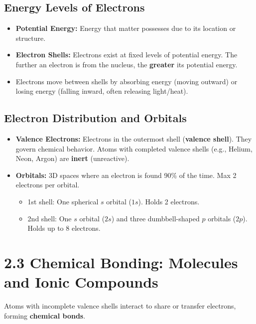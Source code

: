 \documentclass[11pt, a4paper]{article}
\begin{document}
\subsection*{Energy Levels of Electrons}
\begin{itemize}
    \item \textbf{Potential Energy:} Energy that matter possesses due to its location or structure. 
    \item \textbf{Electron Shells:} Electrons exist at fixed levels of potential energy. The further an electron is from the nucleus, the \textbf{greater} its potential energy.
    \item Electrons move between shells by absorbing energy (moving outward) or losing energy (falling inward, often releasing light/heat).
\end{itemize}

\subsection*{Electron Distribution and Orbitals}
\begin{itemize}
    \item \textbf{Valence Electrons:} Electrons in the outermost shell (\textbf{valence shell}). They govern chemical behavior. Atoms with completed valence shells (e.g., Helium, Neon, Argon) are \textbf{inert} (unreactive).
    \item \textbf{Orbitals:} 3D spaces where an electron is found 90\% of the time. Max 2 electrons per orbital.
    \begin{itemize}
        \item 1st shell: One spherical $s$ orbital ($1s$). Holds 2 electrons.
        \item 2nd shell: One $s$ orbital ($2s$) and three dumbbell-shaped $p$ orbitals ($2p$). Holds up to 8 electrons.
    \end{itemize}
\end{itemize}

\section*{2.3 Chemical Bonding: Molecules and Ionic Compounds}
Atoms with incomplete valence shells interact to share or transfer electrons, forming \textbf{chemical bonds}.
\end{document}
